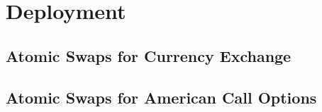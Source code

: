 \section{Deployment}
\label{sec:deployment}

\subsection{Atomic Swaps for Currency Exchange}



\subsection{Atomic Swaps for American Call Options}

